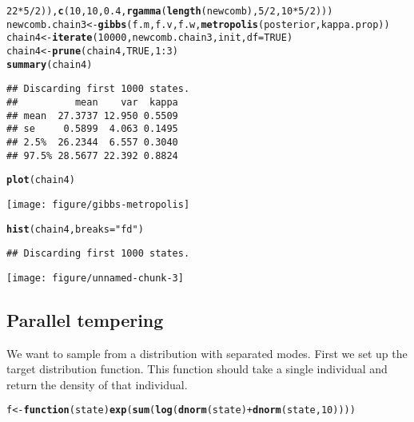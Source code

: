 \documentclass{article}\usepackage[]{graphicx}\usepackage[]{color}
\makeatletter
\def\maxwidth{ %
  \ifdim\Gin@nat@width>\linewidth
    \linewidth
  \else
    \Gin@nat@width
  \fi
}
\newcommand{\hlnum}[1]{\textcolor[rgb]{0.686,0.059,0.569}{#1}}%
\newcommand{\hlstr}[1]{\textcolor[rgb]{0.192,0.494,0.8}{#1}}%
\newcommand{\hlopt}[1]{\textcolor[rgb]{0,0,0}{#1}}%
\newcommand{\hlstd}[1]{\textcolor[rgb]{0.345,0.345,0.345}{#1}}%
\newcommand{\hlkwa}[1]{\textcolor[rgb]{0.161,0.373,0.58}{\textbf{#1}}}%
\newcommand{\hlkwb}[1]{\textcolor[rgb]{0.69,0.353,0.396}{#1}}%
\newcommand{\hlkwc}[1]{\textcolor[rgb]{0.333,0.667,0.333}{#1}}%
\newcommand{\hlkwd}[1]{\textcolor[rgb]{0.737,0.353,0.396}{\textbf{#1}}}%
\newenvironment{kframe}{%
 \def\at@end@of@kframe{}%
 \ifinner\ifhmode%
  \def\at@end@of@kframe{\end{minipage}}%
  \begin{minipage}{\columnwidth}%
 \fi\fi%
 \def\FrameCommand##1{\hskip\@totalleftmargin \hskip-\fboxsep
 \colorbox{shadecolor}{##1}\hskip-\fboxsep
     \hskip-\linewidth \hskip-\@totalleftmargin \hskip\columnwidth}%
 \MakeFramed {\advance\hsize-\width
   \@totalleftmargin\z@ \linewidth\hsize
   \@setminipage}}%
 {\par\unskip\endMakeFramed%
 \at@end@of@kframe}
\newenvironment{knitrout}{}{} %
\makeatother
\begin{document}
\begin{knitrout}
\begin{kframe}
\begin{alltt}
    \hlnum{22} \hlopt{*} \hlnum{5}\hlopt{/}\hlnum{2}\hlstd{)),} \hlkwd{c}\hlstd{(}\hlnum{10}\hlstd{,} \hlnum{10}\hlstd{,} \hlnum{0.4}\hlstd{,} \hlkwd{rgamma}\hlstd{(}\hlkwd{length}\hlstd{(newcomb),} \hlnum{5}\hlopt{/}\hlnum{2}\hlstd{,} \hlnum{10} \hlopt{*} \hlnum{5}\hlopt{/}\hlnum{2}\hlstd{)))}
\hlstd{newcomb.chain3} \hlkwb{<-} \hlkwd{gibbs}\hlstd{(f.m, f.v, f.w,} \hlkwd{metropolis}\hlstd{(posterior, kappa.prop))}
\hlstd{chain4} \hlkwb{<-} \hlkwd{iterate}\hlstd{(}\hlnum{10000}\hlstd{, newcomb.chain3, init,} \hlkwc{df} \hlstd{=} \hlnum{TRUE}\hlstd{)}
\hlstd{chain4} \hlkwb{<-} \hlkwd{prune}\hlstd{(chain4,} \hlnum{TRUE}\hlstd{,} \hlnum{1}\hlopt{:}\hlnum{3}\hlstd{)}
\hlkwd{summary}\hlstd{(chain4)}
\end{alltt}
\begin{verbatim}
## Discarding first 1000 states.
##          mean    var  kappa
## mean  27.3737 12.950 0.5509
## se     0.5899  4.063 0.1495
## 2.5%  26.2344  6.557 0.3040
## 97.5% 28.5677 22.392 0.8824
\end{verbatim}
\begin{alltt}
\hlkwd{plot}\hlstd{(chain4)}
\end{alltt}
\end{kframe}
\texttt{[image: figure/gibbs-metropolis]} 

\end{knitrout}

\begin{knitrout}
\color{fgcolor}\begin{kframe}
\begin{alltt}
\hlkwd{hist}\hlstd{(chain4,} \hlkwc{breaks} \hlstd{=} \hlstr{"fd"}\hlstd{)}
\end{alltt}
\begin{verbatim}
## Discarding first 1000 states.
\end{verbatim}
\end{kframe}
\texttt{[image: figure/unnamed-chunk-3]} 

\end{knitrout}


\subsection{Parallel tempering}
We want to sample from a distribution with separated modes.  First we
set up the target distribution function. This function should take a
single individual and return the density of that individual.
\begin{knitrout}
\color{fgcolor}\begin{kframe}
\begin{alltt}
\hlstd{f} \hlkwb{<-} \hlkwa{function}\hlstd{(}\hlkwc{state}\hlstd{)} \hlkwd{exp}\hlstd{(}\hlkwd{sum}\hlstd{(}\hlkwd{log}\hlstd{(}\hlkwd{dnorm}\hlstd{(state)} \hlopt{+} \hlkwd{dnorm}\hlstd{(state,} \hlnum{10}\hlstd{))))}
\end{alltt}
\end{kframe}
\end{knitrout}
\end{document}
